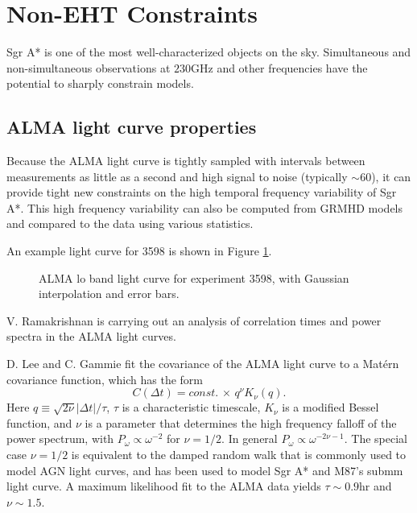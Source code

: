 \documentclass[twocolumn,tighten]{aastex63}
\newcommand\<{{\langle}}
\renewcommand\>{{\rangle}} %
\begin{document}
\section{Non-EHT Constraints}

Sgr A* is one of the most well-characterized objects on the sky. Simultaneous and non-simultaneous observations at $230$GHz and  other frequencies have the potential to sharply constrain models.

\subsection{ALMA light curve properties}

Because the ALMA light curve is tightly sampled with intervals  between measurements as little as a second and high signal to noise (typically $\sim 60$), it can provide tight new constraints on the high temporal frequency variability of Sgr A*.  This high frequency variability can also be computed from GRMHD models and compared to the data using various statistics.

An example light curve for 3598 is shown in Figure \ref{fig:LC3598}.

\begin{figure}
    \centering
    \caption{ALMA lo band light curve for experiment 3598, with Gaussian interpolation and error bars.}
    \label{fig:LC3598}
\end{figure}

V. Ramakrishnan is carrying out an analysis of correlation times and power spectra in the ALMA light curves.

D. Lee and C. Gammie fit the covariance of the ALMA light curve to a Mat\'ern covariance function, which has the form
\begin{equation}
    C(\Delta t) = const. \, \times \, q^\nu K_\nu(q).
\end{equation}
Here $q \equiv \sqrt{2\nu} |\Delta t|/\tau$, $\tau$ is a characteristic timescale, $K_\nu$ is a modified Bessel function, and $\nu$ is a parameter that determines the high frequency falloff of the power spectrum, with $P_\omega \propto \omega^{-2}$ for $\nu = 1/2$.  In general $P_\omega \propto \omega^{-2\nu - 1}$. The special case $\nu = 1/2$ is equivalent to the damped random walk that is commonly used to model AGN light curves, and has been used to model Sgr A* and M87's submm light curve. A maximum likelihood fit to the ALMA data yields $\tau \sim 0.9$hr and $\nu \sim 1.5$.
\end{document}

